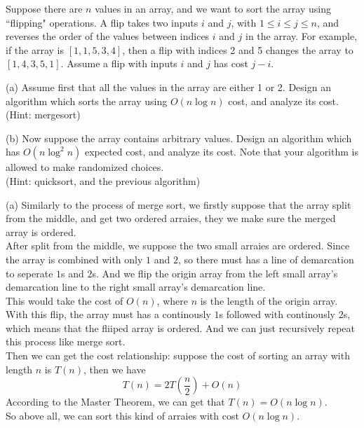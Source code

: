 \problem{}
Suppose there are $n$ values in an array, and we want to sort the array using ``flipping" operations.  A flip takes two inputs $i$ and $j$, with $1 \leq i \leq j \leq n$, and reverses the order of the values between indices $i$ and $j$ in the array.  For example, if the array is $[1,1,5,3,4]$, then a flip with indices 2 and 5 changes the array to $[1,4,3,5,1]$.  Assume a flip with inputs $i$ and $j$ has cost $j-i$.  

\hspace*{\fill}

\noindent (a) Assume first that all the values in the array are either 1 or 2.  Design an algorithm which sorts the array using $O(n \log n)$ cost, and analyze its cost.  \\
(Hint: mergesort)

\hspace*{\fill}

\noindent (b) Now suppose the array contains arbitrary values.   Design an algorithm which has $O(n \log^2 n)$ expected cost, and analyze its cost.  Note that your algorithm is allowed to make randomized choices. \\
(Hint: quicksort, and the previous algorithm)

\solution{}

(a) Similarly to the process of merge sort, we firstly suppose that the array split from the middle, and get two ordered arraies, they we make sure the merged array is ordered.\\
After split from the middle, we suppose the two small arraies are ordered. Since the array is combined with only $1$ and $2$, so there must has a line of demarcation to seperate $1$s and $2$s.
And we flip the origin array from the left small array's demarcation line to the right small array's demarcation line.\\
This would take the cost of $O(n)$, where $n$ is the length of the origin array.\\
With this flip, the array must has a continously $1$s followed with continously $2$s, which means that the fliiped array is ordered. And we can just recursively repeat this process like merge sort.\\

Then we can get the cost relationship: suppose the cost of sorting an array with length $n$ is $T(n)$, then we have
$$T(n)=2T\left(\dfrac{n}{2}\right)+O(n)$$
According to the Master Theorem, we can get that $T(n)=O(n\log n)$.\\
So above all, we can sort this kind of arraies with cost $O(n\log n)$.

